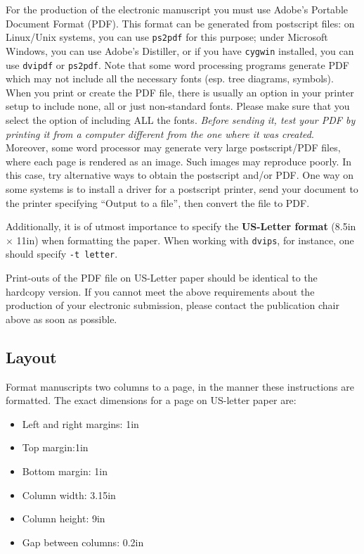 \documentclass[11pt,letterpaper]{article}
\begin{document}
For the production of the electronic manuscript you must use Adobe's
Portable Document Format (PDF). This format can be generated from
postscript files: on Linux/Unix systems, you can use {\tt ps2pdf} for this
purpose; under Microsoft Windows, you can use Adobe's Distiller, or
if you have {\tt cygwin} installed, you can use {\tt dvipdf} or
{\tt ps2pdf}.  Note
that some word processing programs generate PDF which may not include
all the necessary fonts (esp. tree diagrams, symbols). When you print
or create the PDF file, there is usually an option in your printer
setup to include none, all or just non-standard fonts.  Please make
sure that you select the option of including ALL the fonts.  {\em Before sending it, test your PDF by printing it from a computer different from the one where it was created}. Moreover,
some word processor may generate very large postscript/PDF files,
where each page is rendered as an image. Such images may reproduce
poorly.  In this case, try alternative ways to obtain the postscript
and/or PDF.  One way on some systems is to install a driver for a
postscript printer, send your document to the printer specifying
``Output to a file'', then convert the file to PDF.

Additionally, it is of utmost importance to specify the {\bf US-Letter format} (8.5in $\times$ 11in) when formatting the paper. When working with {\tt dvips}, for instance, one should specify {\tt -t letter}.

Print-outs of the PDF file on US-Letter paper should be identical to the
hardcopy version.  If you cannot meet the above requirements about the
production of your electronic submission, please contact the
publication chair above as soon as possible.


\subsection{Layout}
\label{ssec:layout}

Format manuscripts two columns to a page, in the manner these
instructions are formatted. The exact dimensions for a page on US-letter
paper are:

\begin{itemize}
\item Left and right margins: 1in
\item Top margin:1in
\item Bottom margin: 1in
\item Column width: 3.15in
\item Column height: 9in
\item Gap between columns: 0.2in
\end{itemize}
\end{document}
